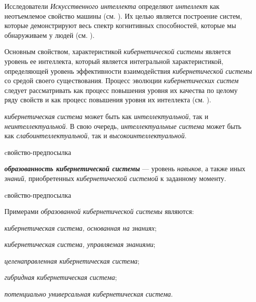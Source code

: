 Исследователи \textit{Искусственного интеллекта} определяют \textit{интеллект} как неотъемлемое свойство машины (см. ). 
Их целью является построение систем, которые демонстрируют весь спектр когнитивных способностей, которые мы обнаруживаем у людей (см. ).

Основным свойством, характеристикой \textit{кибернетической системы} является уровень ее интеллекта, который является интегральной характеристикой, определяющей уровень эффективности взаимодействия \textit{кибернетической системы} со средой своего существования. 
Процесс эволюции \textit{кибернетических систем} следует рассматривать как процесс повышения уровня их качества по целому ряду свойств и как процесс повышения уровня их интеллекта (см. ).

\textit{кибернетическая система} может быть как \textit{интеллектуальной}, так и \textit{неинтеллектуальной}. В свою очередь, \textit{интеллектуальные система} может быть как \textit{слабоинтеллектуальной}, так и \textit{высокоинтеллектуальной}.

\begin{SCn}
\begin{scnrelfromlist}{cвойство-предпосылка}
\end{scnrelfromlist}
\end{SCn}

\textbf{\textit{образованность кибернетической системы}} --- уровень \textit{навыков}, а также иных \textit{знаний}, приобретенных \textit{кибернетической системой} к заданному моменту. 

\begin{SCn}
\begin{scnrelfromlist}{cвойство-предпосылка}
\end{scnrelfromlist}
\end{SCn}

Примерами \textit{образованной кибернетической системы} являются:
\begin{textitemize}
    \item \textit{кибернетическая система, основанная на знаниях};
    \item \textit{кибернетическая система, управляемая знаниями};
    \item \textit{целенаправленная кибернетическая система};
    \item \textit{гибридная кибернетическая система};
    \item \textit{потенциально универсальная кибернетическая система}.
\end{textitemize}

